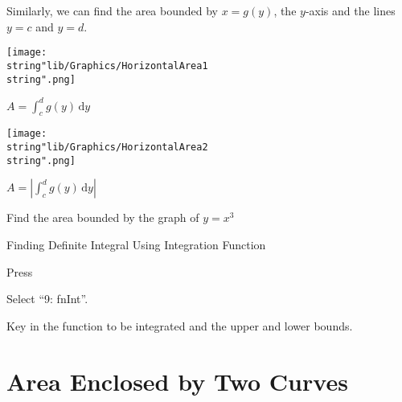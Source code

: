 \documentclass[11pt,a4paper]{book}
\begin{document}
Similarly, we can find the area bounded by $x=g(y)$, the $y$-axis
and the lines $y=c$ and $y=d$.

\begin{minipage}[t]{.5\textwidth}
\begin{center}
\texttt{[image: \\string"lib/Graphics/HorizontalArea1\\string".png]}
\par\end{center}

\begin{center}
${\displaystyle A=\int_{c}^{d}g(y)\,\mathrm{d}y}$
\par\end{center}

\end{minipage}
\begin{minipage}[t]{.5\textwidth}
\begin{center}
\texttt{[image: \\string"lib/Graphics/HorizontalArea2\\string".png]}
\par\end{center}

\begin{center}
${\displaystyle A=\left|\int_{c}^{d}g(y)\,\mathrm{d}y\right|}$
\par\end{center}

\end{minipage}

Find the area bounded by the graph of $y=x^{3}$

\begin{GC}{Finding Definite Integral Using Integration Function}
\begin{steps}[leftmargin=1.5cm]

\item  Press \tcbox[box align=base,nobeforeafter,colback=black, colframe=black,size=small]{\textbf{\textcolor{white}{math}}}

\item  Select ``9: fnInt''.

\item  Key in the function to be integrated and the upper and lower
bounds.

\end{steps}
\end{GC}

\newpage

\section{Area Enclosed by Two Curves}
\end{document}
